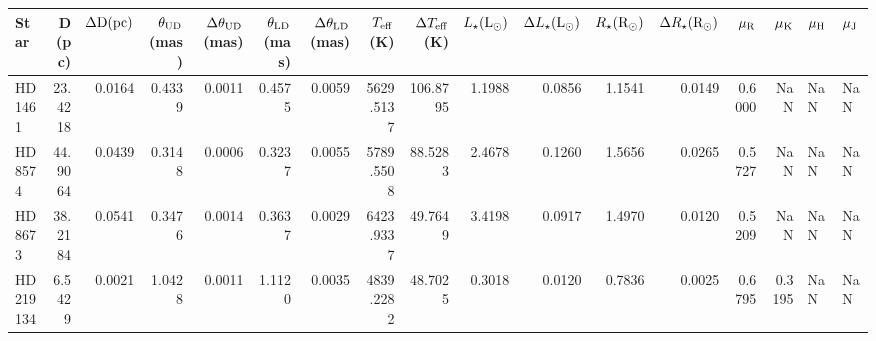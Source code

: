 \begin{tabular}{lrrrrrrrrrrrrrrll}
\toprule
Star & D (pc) & $\Delta \rm D (pc)$ & $\theta_{\rm UD}$ (mas) & $\Delta\theta_{\rm UD}$ (mas) & $\theta_{\rm LD}$ (mas) & $\Delta\theta_{\rm LD}$ (mas) & $T_{\rm eff}$ (K) & $\Delta T_{\rm eff}$ (K) & $L_{\star} (\rm L_{\odot})$ & $\Delta L_{\star} (\rm L_{\odot})$ & $R_{\star} (\rm R_{\odot})$ & $\Delta R_{\star} (\rm R_{\odot})$ & $\mu_{\rm R}$ & $\mu_{\rm K}$ & $\mu_{\rm H}$ & $\mu_{\rm J}$ \\
\midrule
HD 1461 & 23.4218 & 0.0164 & 0.4339 & 0.0011 & 0.4575 & 0.0059 & 5629.5137 & 106.8795 & 1.1988 & 0.0856 & 1.1541 & 0.0149 & 0.6000 & NaN & NaN & NaN \\
HD 8574 & 44.9064 & 0.0439 & 0.3148 & 0.0006 & 0.3237 & 0.0055 & 5789.5508 & 88.5283 & 2.4678 & 0.1260 & 1.5656 & 0.0265 & 0.5727 & NaN & NaN & NaN \\
HD 8673 & 38.2184 & 0.0541 & 0.3476 & 0.0014 & 0.3637 & 0.0029 & 6423.9337 & 49.7649 & 3.4198 & 0.0917 & 1.4970 & 0.0120 & 0.5209 & NaN & NaN & NaN \\
HD 219134 & 6.5429 & 0.0021 & 1.0428 & 0.0011 & 1.1120 & 0.0035 & 4839.2282 & 48.7025 & 0.3018 & 0.0120 & 0.7836 & 0.0025 & 0.6795 & 0.3195 & NaN & NaN \\
\bottomrule
\end{tabular}
